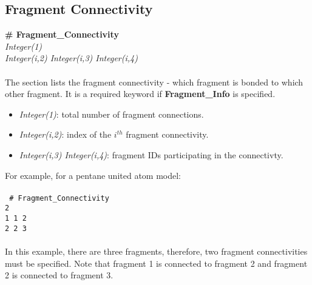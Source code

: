 \subsection{Fragment
  Connectivity}\label{sec:Get_Fragment_Connectivity}
%
{\bf \# Fragment\_Connectivity} \\
%
{\it Integer(1)} \\
%
{\it Integer(i,2) Integer(i,3) Integer(i,4)} \\ \\
%
The section lists the fragment connectivity - which fragment is bonded
to which other fragment. It is a required keyword if {\bf
  Fragment\_Info} is specified.
%
\begin{itemize}
\item {\it Integer(1)}: total number of fragment connections.
%
\item {\it Integer(i,2)}: index of the $i^{th}$ fragment connectivity.
%
\item {\it Integer(i,3) Integer(i,4)}: fragment IDs participating in the connectivty.
\end{itemize}
%
For example, for a pentane united atom model: \\ \\
%
\texttt{
\# Fragment\_Connectivity\\
2\\
1    1    2\\
2    2    3\\
} \\
%
In this example, there are three fragments, therefore, two fragment connectivities must be specified. Note that fragment 1 is connected to fragment 2 and fragment 2 is connected to fragment 3.


